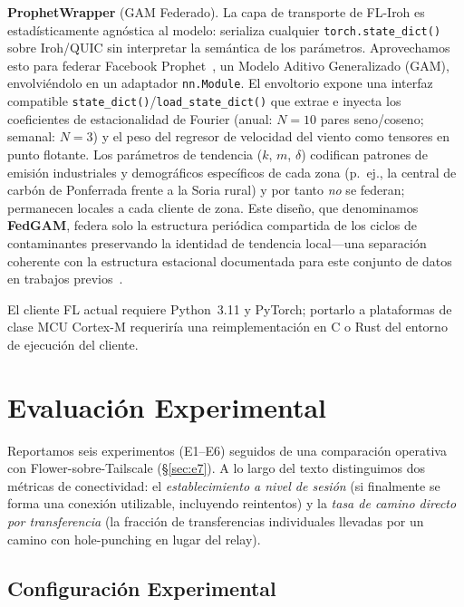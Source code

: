 \documentclass[journal]{IEEEtran}
\begin{document}
\textbf{ProphetWrapper} (GAM Federado). La capa de transporte de FL-Iroh es estadísticamente agnóstica al modelo: serializa cualquier \texttt{torch.state\_dict()} sobre Iroh/QUIC sin interpretar la semántica de los parámetros. Aprovechamos esto para federar Facebook Prophet~\cite{taylor2018prophet}, un Modelo Aditivo Generalizado (GAM), envolviéndolo en un adaptador \texttt{nn.Module}. El envoltorio expone una interfaz compatible \texttt{state\_dict()}/\texttt{load\_state\_dict()} que extrae e inyecta los coeficientes de estacionalidad de Fourier (anual: $N{=}10$ pares seno/coseno; semanal: $N{=}3$) y el peso del regresor de velocidad del viento como tensores en punto flotante. Los parámetros de tendencia ($k$, $m$, $\delta$) codifican patrones de emisión industriales y demográficos específicos de cada zona (p.~ej., la central de carbón de Ponferrada frente a la Soria rural) y por tanto \emph{no} se federan; permanecen locales a cada cliente de zona. Este diseño, que denominamos \textbf{FedGAM}, federa solo la estructura periódica compartida de los ciclos de contaminantes preservando la identidad de tendencia local---una separación coherente con la estructura estacional documentada para este conjunto de datos en trabajos previos~\cite{lopezblanco2024airquality}.

El cliente FL actual requiere Python~3.11 y PyTorch; portarlo a plataformas de clase MCU Cortex-M requeriría una reimplementación en C o Rust del entorno de ejecución del cliente.

\section{Evaluación Experimental}
\label{sec:evaluation}

Reportamos seis experimentos (E1--E6) seguidos de una comparación operativa con Flower-sobre-Tailscale (\S\ref{sec:e7}). A lo largo del texto distinguimos dos métricas de conectividad: el \emph{establecimiento a nivel de sesión} (si finalmente se forma una conexión utilizable, incluyendo reintentos) y la \emph{tasa de camino directo por transferencia} (la fracción de transferencias individuales llevadas por un camino con hole-punching en lugar del relay).

\subsection{Configuración Experimental}
\end{document}
